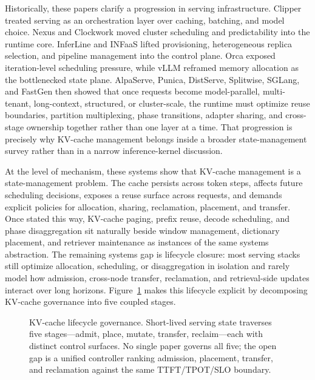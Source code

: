 \documentclass[acmsmall,screen,review]{acmart}
\begin{document}
Historically, these papers clarify a progression in serving infrastructure. Clipper treated serving as an orchestration layer over caching, batching, and model choice. Nexus and Clockwork moved cluster scheduling and predictability into the runtime core. InferLine and INFaaS lifted provisioning, heterogeneous replica selection, and pipeline management into the control plane. Orca exposed iteration-level scheduling pressure, while vLLM reframed memory allocation as the bottlenecked state plane. AlpaServe, Punica, DistServe, Splitwise, SGLang, and FastGen then showed that once requests become model-parallel, multi-tenant, long-context, structured, or cluster-scale, the runtime must optimize reuse boundaries, partition multiplexing, phase transitions, adapter sharing, and cross-stage ownership together rather than one layer at a time. That progression is precisely why KV-cache management belongs inside a broader state-management survey rather than in a narrow inference-kernel discussion.

At the level of mechanism, these systems show that KV-cache management is a state-management problem. The cache persists across token steps, affects future scheduling decisions, exposes a reuse surface across requests, and demands explicit policies for allocation, sharing, reclamation, placement, and transfer. Once stated this way, KV-cache paging, prefix reuse, decode scheduling, and phase disaggregation sit naturally beside window management, dictionary placement, and retriever maintenance as instances of the same systems abstraction. The remaining systems gap is lifecycle closure: most serving stacks still optimize allocation, scheduling, or disaggregation in isolation and rarely model how admission, cross-node transfer, reclamation, and retrieval-side updates interact over long horizons. Figure~\ref{fig:kvcache-lifecycle} makes this lifecycle explicit by decomposing KV-cache governance into five coupled stages.

\begin{figure}[t]
\centering
\resizebox{0.96\textwidth}{!}{}
\caption{KV-cache lifecycle governance. Short-lived serving state traverses five stages---admit, place, mutate, transfer, reclaim---each with distinct control surfaces. No single paper governs all five; the open gap is a unified controller ranking admission, placement, transfer, and reclamation against the same TTFT/TPOT/SLO boundary.}
\label{fig:kvcache-lifecycle}
\end{figure}
\end{document}

